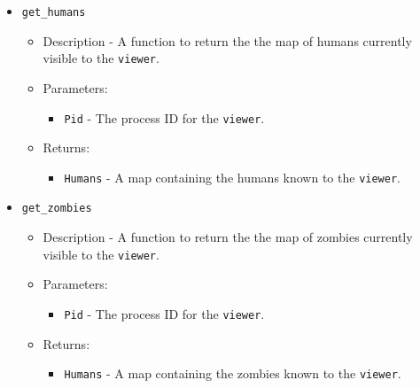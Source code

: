 \begin{itemize}
	\item {\tt get\_humans}
		\begin{itemize}
			\item Description - A function to return the the map of humans currently visible to the \verb+viewer+.
			\item Parameters:
				\begin{itemize}
					\item {\tt Pid} - The process ID for the \verb+viewer+.
				\end{itemize}
			\item Returns:
				\begin{itemize}
					\item {\tt Humans} - A map containing the humans known to the \verb+viewer+.
				\end{itemize}
		\end{itemize}

	\item {\tt get\_zombies}
		\begin{itemize}
			\item Description - A function to return the the map of zombies currently visible to the \verb+viewer+.
			\item Parameters:
				\begin{itemize}
					\item {\tt Pid} - The process ID for the \verb+viewer+.
				\end{itemize}
			\item Returns:
				\begin{itemize}
					\item {\tt Humans} - A map containing the zombies known to the \verb+viewer+.
				\end{itemize}
		\end{itemize}

\end{itemize}
\clearpage
\endinput